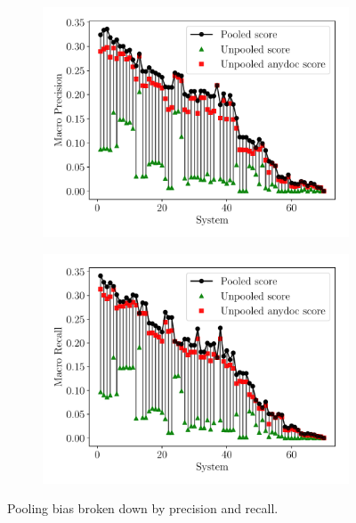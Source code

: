 \begin{figure}[!t]
  \centering
  \begin{subfigure}{0.8\columnwidth}
      \includegraphics[width=\textwidth]{figures/pooling_bias/pooling_bias_p}
  \end{subfigure}

  \begin{subfigure}{0.8\columnwidth}
      \includegraphics[width=\textwidth]{figures/pooling_bias/pooling_bias_r}
  \end{subfigure}
  \caption[Pooling bias for precision and recall in TAC-KBP 2015]{\label{fig:kbpo:pooling-bias-p-r} Pooling bias broken down by precision and recall.}
\end{figure}

